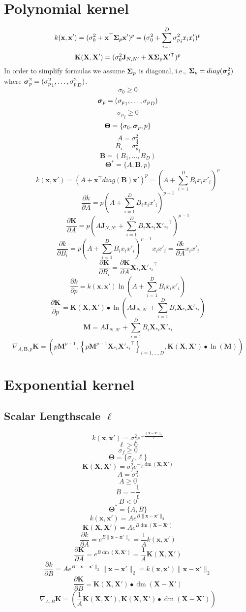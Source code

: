 \documentclass[a4paper,11pt]{article}
\newcommand\x{{\mathbf x}}
\newcommand\X{{\mathbf X}}
\newcommand\K{{\mathbf K}}
\DeclareMathOperator*{\dm}{dm}
\newcommand{\Ivec}[1]{\mbox{\boldmath $#1$}}
\begin{document}
\section{Polynomial kernel}
$$k(\x,\x') = (\sigma_0^2 + \x^{\top} \Ivec{\Sigma}_p \x')^p =
(\sigma_0^2 + \sum_{i=1}^D {\sigma^2_p}_i x_i x'_i)^p$$
$$\K(\X,\X') = (\sigma_0^2 \mathbf{J}_{N,N'} + \X \Ivec{\Sigma}_p
\X'^{\top})^p$$
In order to simplify formulas we assume $\Ivec{\Sigma}_p$ is diagonal, i.e.,
$\Ivec{\Sigma}_p = diag(\Ivec{\sigma}^2_p)$ where $\Ivec{\sigma}^2_p =
({\sigma^2_p}_1,\ldots,{\sigma^2_p}_D)$.
$$\sigma_0 \ge 0$$
$$\Ivec{\sigma}_p = ({\sigma_p}_1,\ldots,{\sigma_p}_D)$$
$${\sigma_p}_i \ge 0$$
$$\mathbf{\Theta} = \{\sigma_0,\Ivec{\sigma}_p, p\}$$
$$A = \sigma_0^2$$
$$B_i = {\sigma^2_p}_i$$
$$\mathbf{B} = (B_1,\ldots,B_D)$$
$$\mathbf{\Theta}^* = \{A,\mathbf{B}, p\}$$
$$k(\x,\x') = (A + \x^{\top} diag(\mathbf{B}) \x')^p = (A +
\sum_{i=1}^D B_i x_i x'_i)^p$$
$$\frac{\partial k}{\partial A} = p(A + \sum_{i=1}^D B_i x_i
x'_i)^{p-1}$$
$$\frac{\partial \K}{\partial A} = p(A\mathbf{J}_{N,N'} + \sum_{i=1}^D
B_i \X_{*i} {\X'_{*i}}^{\top})^{p-1}$$
$$\frac{\partial k}{\partial B_i} = p(A + \sum_{i=1}^D B_i x_i
x'_i)^{p-1} x_i x'_i = \frac{\partial k}{\partial A} x_i x'_i$$
$$\frac{\partial \K}{\partial B_i} = \frac{\partial \K}{\partial A} \X_{*i} {\X'_{*i}}^{\top}$$
$$\frac{\partial k}{\partial p} = k(\x,\x') \ln(A + \sum_{i=1}^D B_i x_i
x'_i)$$
$$\frac{\partial \K}{\partial p} = \K(\X,\X') \bullet \ln(A \mathbf{J}_{N,N'}+ \sum_{i=1}^D B_i \X_{*i} \X'_{*i})$$
$$\mathbf{M} = A \mathbf{J}_{N,N'}+ \sum_{i=1}^D B_i \X_{*i} \X'_{*i}$$
$$\nabla_{A,\mathbf{B},p} \K = \left(p\mathbf{M}^{p-1},\left\{p\mathbf{M}^{p-1} \X_{*i} {\X'_{*i}}^{\top} \right\}_{i=1,\ldots,D}, \K(\X,\X') \bullet \ln(\mathbf{M}) \right)$$

\section{Exponential kernel}
\subsection{Scalar Lengthscale $\ell$}
$$k(\x,\x') = \sigma_f^2 e^{-\frac{\|\x-\x'\|_2}{\ell}}$$
$$\ell > 0$$
$$\sigma_f \ge 0$$
$$\mathbf{\Theta} = \{ \sigma_f, \ell \}$$
$$\K(\X,\X') = \sigma_f^2 e^{-\frac{1}{\ell}\dm(\X,\X')}$$
$$A = \sigma_f^2$$
$$A \ge 0$$
$$B = -\frac{1}{\ell}$$
$$B < 0$$
$$\mathbf{\Theta}^* = \{ A, B \}$$
$$k(\x,\x') = A e^{B\|\x-\x'\|_2}$$
$$\K(\X,\X') = A e^{B \dm(\X-\X')}$$
$$\frac{\partial k}{\partial A} = e^{B\|\x-\x'\|_2} = \frac{1}{A}k(\x,\x')$$
$$\frac{\partial \K}{\partial A} = e^{B \dm(\X,\X')} = \frac{1}{A} \K(\X,\X')$$
$$\frac{\partial k}{\partial B} = A e^{B\|\x-\x'\|_2} \|\x-\x'\|_2 =
k(\x,\x') \|\x-\x'\|_2$$
$$\frac{\partial \K}{\partial B} = \K(\X,\X') \bullet \dm(\X-\X')$$
$$\nabla_{A,B} \K = (\frac{1}{A} \K(\X,\X'), \K(\X,\X') \bullet \dm(\X-\X'))$$
\end{document}
